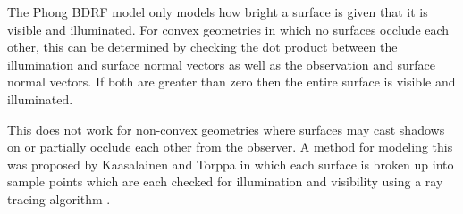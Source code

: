The Phong BDRF model only models how bright a surface is given that it is visible and illuminated. For convex geometries in which no surfaces occlude each other, this can be determined by checking the dot product between the illumination and surface normal vectors as well as the observation and surface normal vectors. If both are greater than zero then the entire surface is visible and illuminated.

This does not work for non-convex geometries where surfaces may cast shadows on or partially occlude each other from the observer. A method for modeling this was proposed by Kaasalainen and Torppa in which each surface is broken up into sample points which are each checked for illumination and visibility using a ray tracing algorithm \cite{Kaasalainen_LCI}.
